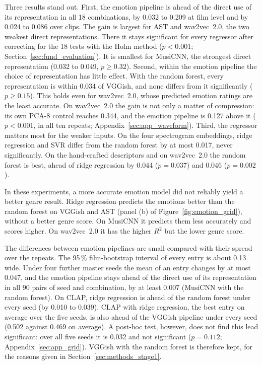 Three results stand out. First, the emotion pipeline is ahead of the direct use of its
representation in all 18 combinations, by 0.032 to 0.209 at film level and by 0.024 to
0.086 over clips. The gain is largest for AST and wav2vec~2.0, the two weakest direct
representations. There it stays significant for every regressor after correcting for the
18 tests with the Holm method ($p<0.001$; Section~\ref{sec:fund_evaluation}). It is
smallest for MusiCNN, the strongest direct representation (0.032 to 0.049, $p\geq0.32$).
Second, within the emotion pipeline the choice of representation has little effect. With the random
forest, every representation is within 0.034 of VGGish, and none differs from it
significantly ($p\geq0.15$). This holds even for wav2vec~2.0, whose predicted emotion ratings are the least accurate. On wav2vec~2.0 the
gain is not only a matter of compression: its own PCA-8 control reaches 0.344, and the
emotion pipeline is 0.127 above it ($p<0.001$, in all ten repeats;
Appendix~\ref{sec:app_waveform}). Third, the regressor matters most for the weaker inputs.
On the four spectrogram embeddings, ridge regression and SVR differ from the random forest
by at most 0.017, never significantly. On the hand-crafted descriptors and on wav2vec~2.0
the random forest is best, ahead of ridge regression by 0.044 ($p=0.037$) and 0.046
($p=0.002$).

In these experiments, a more accurate emotion model did not reliably yield a better genre
result. Ridge
regression predicts the emotions better than the random forest on VGGish and AST (panel (b) of
Figure~\ref{fig:emotion_grid}), without a better genre score. On MusiCNN it
predicts them less accurately and scores higher. On wav2vec~2.0 it has the higher $R^2$ but the
lower genre score.

The differences between emotion pipelines are small compared with their spread over the
repeats. The 95\,\% film-bootstrap interval of every entry is about
0.13 wide. Under four further master seeds the mean of an entry changes by at most 0.047, and
the emotion pipeline stays ahead of the direct use of its representation in all 90 pairs of
seed and combination, by at least 0.007 (MusiCNN with the random forest). On CLAP, ridge
regression is ahead of the random forest under every seed (by 0.010 to 0.039). CLAP with ridge regression, the best entry on average over the five seeds, is also ahead of the VGGish pipeline under every seed (0.502 against 0.469
on average). A post-hoc test, however, does not find this lead significant: over all five
seeds it is 0.032 and not significant ($p=0.112$; Appendix~\ref{sec:app_grid}). VGGish with the random forest is therefore kept, for the reasons given in Section~\ref{sec:methods_stage1}.

